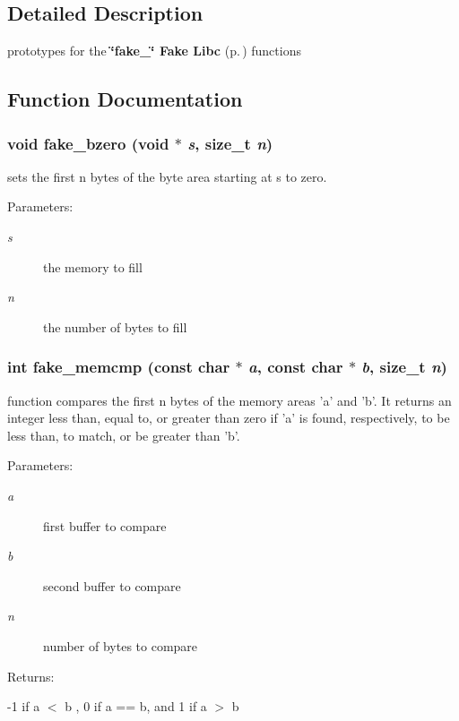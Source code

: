 \subsection{Detailed Description}
prototypes for the {\bf \char`\"{}fake\_\-\char`\"{} Fake Libc} {\rm (p.\,\pageref{group__fake__lib})} functions





\subsection{Function Documentation}
\subsubsection{\setlength{\rightskip}{0pt plus 5cm}void fake\_\-bzero (void $\ast$ {\em s}, size\_\-t {\em n})}\label{fake__lib_8h_a2}


sets the first n bytes of the byte area starting at s to zero.

\begin{Desc}
\item[Parameters: ]\par
\begin{description}
\item[{\em 
s}]the memory to fill \item[{\em 
n}]the number of bytes to fill \end{description}
\end{Desc}
\subsubsection{\setlength{\rightskip}{0pt plus 5cm}int fake\_\-memcmp (const char $\ast$ {\em a}, const char $\ast$ {\em b}, size\_\-t {\em n})}\label{fake__lib_8h_a3}


function compares the first n bytes of the memory areas 'a' and 'b'. It returns an integer less than, equal to, or greater than zero if 'a' is found, respectively, to be less than, to match, or be greater than 'b'.

\begin{Desc}
\item[Parameters: ]\par
\begin{description}
\item[{\em 
a}]first buffer to compare \item[{\em 
b}]second buffer to compare \item[{\em 
n}]number of bytes to compare \end{description}
\end{Desc}
\begin{Desc}
\item[Returns: ]\par
-1 if a $<$ b , 0 if a == b, and 1 if a $>$ b \end{Desc}
